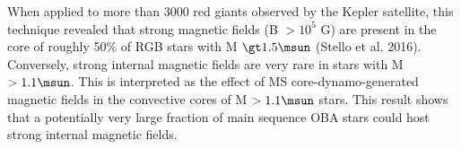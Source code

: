 When applied to more than 3000 red giants observed by the Kepler satellite, this technique revealed that
strong magnetic fields (B $\gt 10^5$ G) are present in the core of roughly 50\% of RGB stars with M $\gt 1.5\msun$ (Stello et al. 2016).
Conversely, strong internal magnetic fields are very rare in stars with M $> 1.1\msun$. This is interpreted as the
effect of MS core-dynamo-generated magnetic fields in the convective cores of M $> 1.1\msun$ stars.
This result shows that a potentially very large fraction of main sequence OBA stars could host strong internal magnetic fields.




